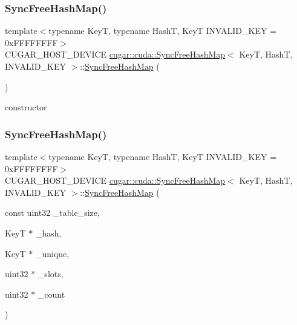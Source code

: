 \subsubsection{\texorpdfstring{Sync\+Free\+Hash\+Map()}{SyncFreeHashMap()}\hspace{0.1cm}{\footnotesize\ttfamily [1/2]}}
{\footnotesize\ttfamily template$<$typename KeyT, typename HashT, KeyT I\+N\+V\+A\+L\+I\+D\+\_\+\+K\+EY = 0x\+F\+F\+F\+F\+F\+F\+FF$>$ \\
C\+U\+G\+A\+R\+\_\+\+H\+O\+S\+T\+\_\+\+D\+E\+V\+I\+CE \hyperlink{structcugar_1_1cuda_1_1_sync_free_hash_map}{cugar\+::cuda\+::\+Sync\+Free\+Hash\+Map}$<$ KeyT, HashT, I\+N\+V\+A\+L\+I\+D\+\_\+\+K\+EY $>$\+::\hyperlink{structcugar_1_1cuda_1_1_sync_free_hash_map}{Sync\+Free\+Hash\+Map} (\begin{DoxyParamCaption}{ }\end{DoxyParamCaption})\hspace{0.3cm}{\ttfamily [inline]}}

constructor \mbox{\label{structcugar_1_1cuda_1_1_sync_free_hash_map_abb195d74c19002c772c3ca6013e4d72f}} 
\subsubsection{\texorpdfstring{Sync\+Free\+Hash\+Map()}{SyncFreeHashMap()}\hspace{0.1cm}{\footnotesize\ttfamily [2/2]}}
{\footnotesize\ttfamily template$<$typename KeyT, typename HashT, KeyT I\+N\+V\+A\+L\+I\+D\+\_\+\+K\+EY = 0x\+F\+F\+F\+F\+F\+F\+FF$>$ \\
C\+U\+G\+A\+R\+\_\+\+H\+O\+S\+T\+\_\+\+D\+E\+V\+I\+CE \hyperlink{structcugar_1_1cuda_1_1_sync_free_hash_map}{cugar\+::cuda\+::\+Sync\+Free\+Hash\+Map}$<$ KeyT, HashT, I\+N\+V\+A\+L\+I\+D\+\_\+\+K\+EY $>$\+::\hyperlink{structcugar_1_1cuda_1_1_sync_free_hash_map}{Sync\+Free\+Hash\+Map} (\begin{DoxyParamCaption}\item[{const uint32}]{\+\_\+table\+\_\+size,  }\item[{KeyT $\ast$}]{\+\_\+hash,  }\item[{KeyT $\ast$}]{\+\_\+unique,  }\item[{uint32 $\ast$}]{\+\_\+slots,  }\item[{uint32 $\ast$}]{\+\_\+count }\end{DoxyParamCaption})\hspace{0.3cm}{\ttfamily [inline]}}

